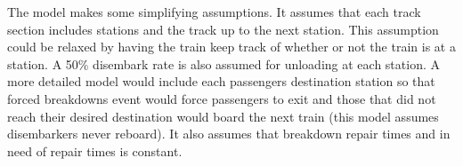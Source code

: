 The model makes some simplifying assumptions. It assumes that each track section
includes stations and the track up to the next station. This assumption could be
relaxed by having the train keep track of whether or not the train is at a
station. A 50\% disembark rate is also assumed for unloading at each station. A
more detailed model would include each passengers destination station so that
forced breakdowns event would force passengers to exit and those that did not
reach their desired destination would board the next train (this model assumes
disembarkers never reboard). It also assumes that breakdown repair times and in
need of repair times is constant.

\newcommand{\InBreakDown}[0]{(\text{``Breakdown''}, ())}
\newcommand{\InCapReq}[0]{(\text{``Capacity Request''}, ())}
\newcommand{\InMoveRes}[1]{(\text{``Move Response''}, #1)}
\newcommand{\InLoadPassengers}[1]{(\text{``Load Passengers''}, #1)}

\newcommand{\OutRemainingCapacity}[1]{(\text{``Remaining Capacity''}, #1)}
\newcommand{\OutUnloadPassengers}[1]{(\text{``Unload Passengers''}, #1)}
\newcommand{\OutMoveReq}[0]{(\text{``Move Request''}, ())}
\newcommand{\phase}[0]{\text{phase}}

\newcommand{\Mod}[2]{\mathrm{mod} (#1, #2)}

